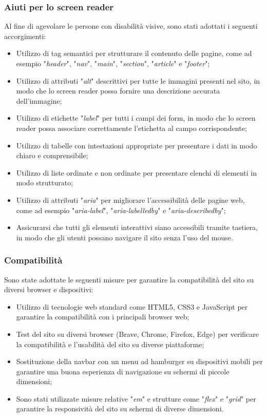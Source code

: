 \documentclass[11pt,a4paper]{article}
\begin{document}
\subsubsection{Aiuti per lo screen reader}
Al fine di agevolare le persone con disabilità visive, sono stati adottati i seguenti accorgimenti:
\begin{itemize}
    \item Utilizzo di tag semantici per strutturare il contenuto delle pagine, come ad esempio "\textit{header}", "\textit{nav}", "\textit{main}", "\textit{section}", "\textit{article}" e "\textit{footer}";
    \item Utilizzo di attributi "\textit{alt}" descrittivi per tutte le immagini presenti nel sito, in modo che lo screen reader possa fornire una descrizione accurata dell'immagine;
    \item Utilizzo di etichette "\textit{label}" per tutti i campi dei form, in modo che lo screen reader possa associare correttamente l'etichetta al campo corrispondente;
    \item Utilizzo di tabelle con intestazioni appropriate per presentare i dati in modo chiaro e comprensibile;
    \item Utilizzo di liste ordinate e non ordinate per presentare elenchi di elementi in modo strutturato;
    \item Utilizzo di attributi "\textit{aria}" per migliorare l'accessibilità delle pagine web, come ad esempio "\textit{aria-label}", "\textit{aria-labelledby}" e "\textit{aria-describedby}";
    \item Assicurarsi che tutti gli elementi interattivi siano accessibili tramite tastiera, in modo che gli utenti possano navigare il sito senza l'uso del mouse.
\end{itemize}
\subsubsection{Compatibilità}
Sono state adottate le seguenti misure per garantire la compatibilità del sito su diversi browser e dispositivi:
\begin{itemize}
    \item Utilizzo di tecnologie web standard come HTML5, CSS3 e JavaScript per garantire la compatibilità con i principali browser web;
    \item Test del sito su diversi browser (Brave, Chrome, Firefox, Edge) per verificare la compatibilità e l'usabilità del sito su diverse piattaforme;
    \item Sostituzione della navbar con un menu ad hamburger su dispositivi mobili per garantire una buona esperienza di navigazione su schermi di piccole dimensioni;
    \item Sono stati utilizzate misure relative "\textit{em}" e strutture come "\textit{flex}" e "\textit{grid}" per garantire la responsività del sito su schermi di diverse dimensioni.
\end{itemize}
\end{document}
